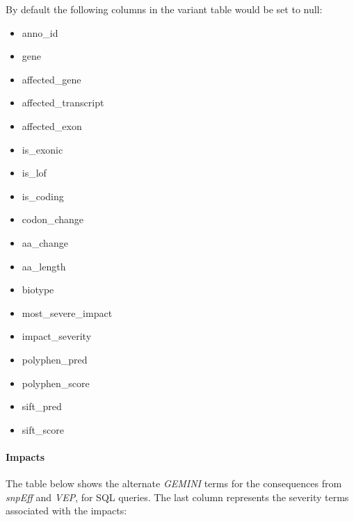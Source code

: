 \documentclass[letterpaper,10pt,english]{sphinxmanual}
\begin{document}
By default the following columns in the variant table would be set to null:
\begin{itemize}
\item {} 
anno\_id

\item {} 
gene

\item {} 
affected\_gene

\item {} 
affected\_transcript

\item {} 
affected\_exon

\item {} 
is\_exonic

\item {} 
is\_lof

\item {} 
is\_coding

\item {} 
codon\_change

\item {} 
aa\_change

\item {} 
aa\_length

\item {} 
biotype

\item {} 
most\_severe\_impact

\item {} 
impact\_severity

\item {} 
polyphen\_pred

\item {} 
polyphen\_score

\item {} 
sift\_pred

\item {} 
sift\_score

\end{itemize}


\paragraph{Impacts}
\label{content/installation:impacts}
The table below shows the alternate \emph{GEMINI} terms for the consequences from \emph{snpEff} and \emph{VEP}, for SQL queries.
The last column represents the severity terms associated with the impacts:
\end{document}

